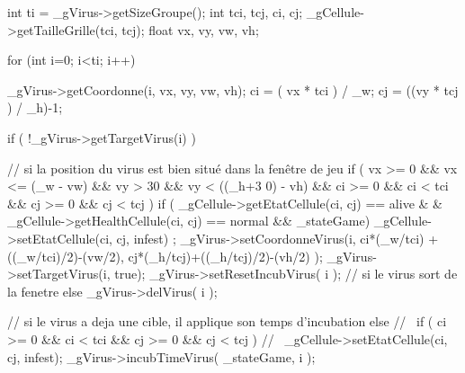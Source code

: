 \begin{DoxyCode}
{
        int ti = _gVirus->getSizeGroupe();
        int tci, tcj, ci, cj;
        _gCellule->getTailleGrille(tci, tcj);
        float vx, vy, vw, vh;
        
        for (int i=0; i<ti; i++)
        {
                _gVirus->getCoordonne(i, vx, vy, vw, vh);
                ci = ( vx * tci ) / _w;
                cj = ((vy * tcj ) / _h)-1;

                if (  !_gVirus->getTargetVirus(i) )
                {

// si la position du virus est bien situé dans la fenêtre de jeu                        
                        if ( vx >= 0 && vx <= (_w - vw) && vy > 30 && vy < ((_h+3
      0) - vh)
                                && ci >= 0 && ci < tci && cj >= 0 && cj < tcj ) 
                        {
                                if ( _gCellule->getEtatCellule(ci, cj) == alive &
      & _gCellule->getHealthCellule(ci, cj) == normal 
                                        && _stateGame)
                                {
                                        _gCellule->setEtatCellule(ci, cj, infest)
      ;
                                        _gVirus->setCoordonneVirus(i, ci*(_w/tci)
      +((_w/tci)/2)-(vw/2), cj*(_h/tcj)+((_h/tcj)/2)-(vh/2) );
                                        _gVirus->setTargetVirus(i, true);
                                        _gVirus->setResetIncubVirus( i );
                                }
                        }
// si le virus sort de la fenetre
                        else 
                        {
                                _gVirus->delVirus( i );
                        }
                }
                        
// si le virus a deja une cible, il applique son temps d'incubation
                else
                {
                        //~ if ( ci >= 0 && ci < tci && cj >= 0 && cj < tcj )
                                //~ _gCellule->setEtatCellule(ci, cj, infest);
                        _gVirus->incubTimeVirus( _stateGame, i );                       
                }
        }
}
\end{DoxyCode}



